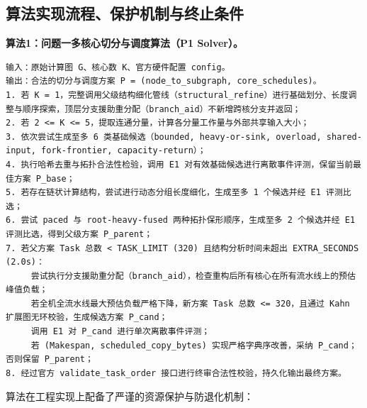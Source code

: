 \documentclass[anonymous,notoc]{gmcm2026}
\begin{document}
\subsection{算法实现流程、保护机制与终止条件}

\textbf{算法1：问题一多核心切分与调度算法（P1 Solver）。}

\begin{lstlisting}[style=gmcmappendix,language={}]
输入：原始计算图 G、核心数 K、官方硬件配置 config。
输出：合法的切分与调度方案 P = (node_to_subgraph, core_schedules)。
1. 若 K = 1，完整调用父级结构细化管线（structural_refine）进行基础划分、长度调整与顺序探索，顶层分支援助重分配（branch_aid）不新增跨核分支并返回；
2. 若 2 <= K <= 5，提取连通分量，计算各分量工作量与外部共享输入大小；
3. 依次尝试生成至多 6 类基础候选（bounded, heavy-or-sink, overload, shared-input, fork-frontier, capacity-return）；
4. 执行哈希去重与拓扑合法性检验，调用 E1 对有效基础候选进行离散事件评测，保留当前最佳方案 P_base；
5. 若存在链状计算结构，尝试进行动态分组长度细化，生成至多 1 个候选并经 E1 评测比选；
6. 尝试 paced 与 root-heavy-fused 两种拓扑保形顺序，生成至多 2 个候选并经 E1 评测比选，得到父级方案 P_parent；
7. 若父方案 Task 总数 < TASK_LIMIT (320) 且结构分析时间未超出 EXTRA_SECONDS (2.0s)：
     尝试执行分支援助重分配（branch_aid），检查重构后所有核心在所有流水线上的预估峰值负载；
     若全机全流水线最大预估负载严格下降，新方案 Task 总数 <= 320，且通过 Kahn 扩展图无环校验，生成候选方案 P_cand；
     调用 E1 对 P_cand 进行单次离散事件评测；
     若 (Makespan, scheduled_copy_bytes) 实现严格字典序改善，采纳 P_cand；否则保留 P_parent；
8. 经过官方 validate_task_order 接口进行终审合法性校验，持久化输出最终方案。
\end{lstlisting}

算法在工程实现上配备了严谨的资源保护与防退化机制：
\end{document}
